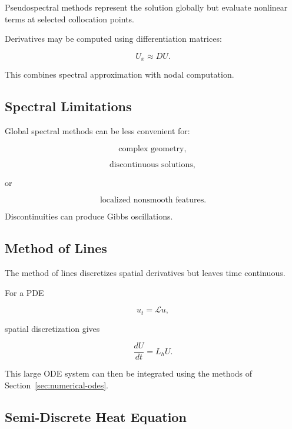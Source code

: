 Pseudospectral methods represent the solution globally but evaluate
nonlinear terms at selected collocation points.

Derivatives may be computed using differentiation matrices:

\[
\boxed{
U_x
\approx
DU.
}
\]

This combines spectral approximation with nodal computation.

\subsection{Spectral Limitations}
\label{subsec:spectral-limitations}

Global spectral methods can be less convenient for:

\[
\boxed{
\text{complex geometry},
}
\]

\[
\boxed{
\text{discontinuous solutions},
}
\]

or

\[
\boxed{
\text{localized nonsmooth features}.
}
\]

Discontinuities can produce Gibbs oscillations.

\subsection{Method of Lines}
\label{subsec:pde-method-of-lines}

The method of lines discretizes spatial derivatives but leaves time
continuous.

For a PDE

\[
u_t
=
\mathcal{L}u,
\]

spatial discretization gives

\[
\boxed{
\frac{dU}{dt}
=
L_hU.
}
\]

This large ODE system can then be integrated using the methods of
Section~\ref{sec:numerical-odes}.

\subsection{Semi-Discrete Heat Equation}
\label{subsec:semidiscrete-heat}

